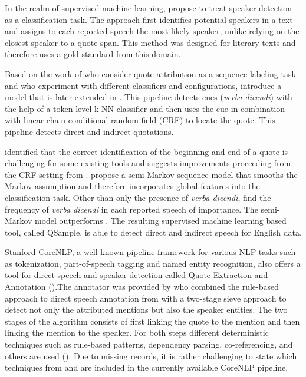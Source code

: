 \documentclass{ccr}
\begin{document}
In the realm of supervised machine learning, \textcite{elson2010automatic} propose to treat speaker detection as a classification task. The approach first identifies potential speakers in a text and assigns to each reported speech the most likely speaker, unlike relying on the closest speaker to a quote span. This method was designed for literary texts and therefore uses a gold standard from this domain.

Based on the work of \textcite{o2012sequence} who consider quote attribution as a sequence labeling task and who experiment with different classifiers and configurations, \textcite{pareti2013automatically} introduce a model that is later extended in \textcite{pareti2015attribution}. This pipeline detects cues (\textit{verba dicendi}) with the help of a token-level k-NN classifier and then uses the cue in combination with linear-chain conditional random field (CRF) to locate the quote. This pipeline detects direct and indirect quotations.

\textcite{scheible2016model} identified that the correct identification of the beginning and end of a quote is challenging for some existing tools and suggests improvements proceeding from the CRF setting from \textcite{pareti2013automatically}. \textcite{scheible2016model} propose a semi-Markov sequence model that smooths the Markov assumption and therefore incorporates global features into the classification task. Other than only the presence of \textit{verba dicendi}, \textcite{scheible2016model} find the frequency of \textit{verba dicendi} in each reported speech of importance. The semi-Markov model outperforms \textcite{pareti2015attribution}. The resulting supervised machine learning based tool, called QSample, is able to detect direct and indirect speech for English data.

Stanford CoreNLP, a well-known pipeline framework for various NLP tasks such as tokenization, part-of-speech tagging and named entity recognition, also offers a tool for direct speech and speaker detection called Quote Extraction and Annotation (\cite{manning2014stanford}).The annotator was provided by \textcite{muzny2017two} who combined the rule-based approach to direct speech annotation from \textcite{o2012sequence} with a two-stage sieve approach to detect not only the attributed mentions but also the speaker entities. The two stages of the algorithm consists of first linking the quote to the mention and then linking the mention to the speaker. For both steps different deterministic techniques such as rule-based patterns, dependency parsing, co-referencing, and others are used (\cite{muzny2017two}). Due to missing records, it is rather challenging to state which techniques from \textcite{o2012sequence} and \textcite{muzny2017two} are included in the currently available CoreNLP pipeline.
\end{document}

